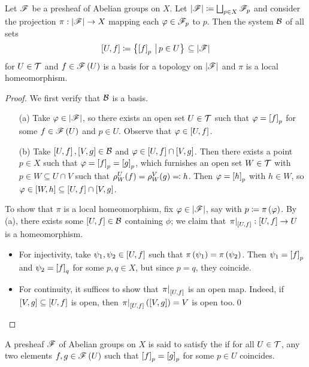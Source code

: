 \documentclass[../Moduli_Spaces_of_Riemann_Surfaces.tex]{subfiles}
\begin{document}
    \begin{proposition}
        Let $\mathscr{F}$ be a presheaf of Abelian groups on $X$. Let $\left|\mathscr{F}\right|\coloneqq\bigsqcup_{p\in X}\mathscr{F}_p$ and consider the projection $\pi:\left|\mathscr{F}\right|\to X$ mapping each $\varphi\in\mathscr{F}_p$ to $p$. Then the system $\mathcal{B}$ of all sets
        \begin{equation*}
            \left[U,f\right]\coloneqq\bigl\{\left[f\right]_p\,\left|\,p\in U\bigr\}\right.\subseteq\left|\mathscr{F}\right|
        \end{equation*}
        for $U\in\mathcal{T}$ and $f\in\mathscr{F}\left(U\right)$ is a basis for a topology on $\left|\mathscr{F}\right|$ and $\pi$ is a local homeomorphism.
    \end{proposition}
    \begin{proof}
        We first verify that $\mathcal{B}$ is a basis.
        \begin{enumerate}
            \item[(a)] Take $\varphi\in\left|\mathscr{F}\right|$, so there exists an open set $U\in\mathcal{T}$ such that $\varphi=\left[f\right]_p$ for some $f\in\mathscr{F}\left(U\right)$ and $p\in U$. Observe that $\varphi\in\left[U,f\right]$.
            \item[(b)] Take $\left[U,f\right],\left[V,g\right]\in\mathcal{B}$ and $\varphi\in\left[U,f\right]\cap\left[V,g\right]$. Then there exists a point $p\in X$ such that $\varphi=\left[f\right]_p=\left[g\right]_p$, which furnishes an open set $W\in\mathcal{T}$ with $p\in W\subseteq U\cap V$ such that $\rho^U_W\!\left(f\right)=\rho^V_W\!\left(g\right)\eqqcolon h$. Then $\varphi=\left[h\right]_p$ with $h\in W$, so $\varphi\in\left[W,h\right]\subseteq\left[U,f\right]\cap\left[V,g\right]$.
        \end{enumerate}
        To show that $\pi$ is a local homeomorphism, fix $\varphi\in\left|\mathscr{F}\right|$, say with $p\coloneqq\pi\left(\varphi\right)$. By (a), there exists some $\left[U,f\right]\in\mathcal{B}$ containing $\phi$; we claim that $\left.\pi\right|_{\left[U,f\right]}:\left[U,f\right]\to U$ is a homeomorphism.
        \begin{itemize}
            \item For injectivity, take $\psi_1,\psi_2\in\left[U,f\right]$ such that $\pi\left(\psi_1\right)=\pi\left(\psi_2\right)$. Then $\psi_1=\left[f\right]_p$ and $\psi_2=\left[f\right]_q$ for some $p,q\in X$, but since $p=q$, they coincide.
            \item For continuity, it suffices to show that $\left.\pi\right|_{\left[U,f\right]}$ is an open map. Indeed, if $\left[V,g\right]\subseteq\left[U,f\right]$ is open, then $\left.\pi\right|_{\left[U,f\right]}\left(\left[V,g\right]\right)=V$ is open too.\qed
        \end{itemize}
    \end{proof}
    \begin{definition}
        A presheaf $\mathscr{F}$ of Abelian groups on $X$ is said to satisfy the  if for all $U\in\mathcal{T}$, any two elements $f,g\in\mathscr{F}\left(U\right)$ such that $\left[f\right]_p=\left[g\right]_p$ for some $p\in U$ coincides.
    \end{definition}
\end{document}
